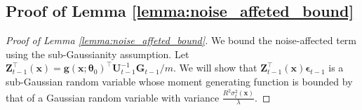 \subsection{Proof of Lemma \ref{lemma:noise_affeted_bound}}
\label{noise_affeted_bound_proof}
\begin{proof}[Proof of Lemma \ref{lemma:noise_affeted_bound}]
    
We bound the noise-affected term using the sub-Gaussianity assumption. Let $\mathbf{Z}_{t-1}^\top(\mathbf{x})  = \mathbf{g}(\mathbf{x}; \boldsymbol{\theta}_0)^\top \mathbf{U}^{-1}_{t-1} \mathbf{G}_{t-1} /m$. We will show that $\mathbf{Z}_{t-1}^\top(\mathbf{x}) \boldsymbol{\epsilon}_{t-1}$ is a sub-Gaussian random variable whose moment generating function is bounded by that
of a Gaussian random variable with variance $\frac{R^2\sigma_{t}^2(\mathbf{x})}{\lambda}$.


\end{proof}
